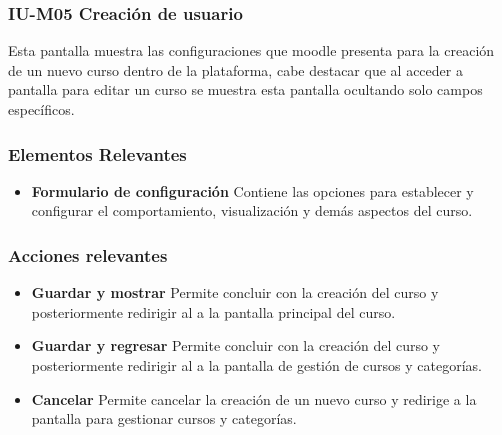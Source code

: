 
\subsubsection{IU-M05 Creación de usuario}

 Esta pantalla muestra las configuraciones que moodle presenta para la creación de
 un nuevo curso dentro de la plataforma, cabe destacar que al acceder a pantalla
 para editar un curso se muestra esta pantalla ocultando solo campos específicos.


\subsubsection{Elementos Relevantes}

    \begin{itemize}
    \item {\bf Formulario de configuración}
        Contiene las opciones para establecer y configurar el comportamiento, 
        visualización y demás aspectos del curso.
    \end{itemize}

\subsubsection{Acciones relevantes}

    \begin{itemize}
    \item {\bf Guardar y mostrar}
        Permite concluir con la creación del curso y posteriormente redirigir
        al  a la pantalla principal del curso.
    \item {\bf Guardar y regresar}
        Permite concluir con la creación del curso y posteriormente redirigir
        al  a la pantalla de gestión de cursos y categorías.
    \item {\bf Cancelar}
        Permite cancelar la creación de un nuevo curso y redirige a la pantalla
        para gestionar cursos y categorías.
    \end{itemize}

\clearpage

